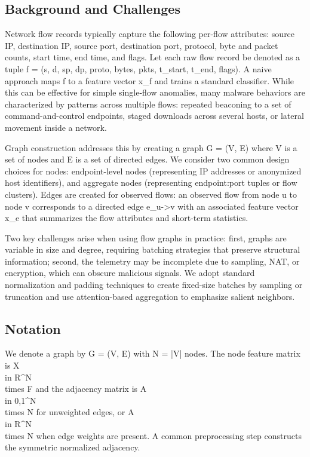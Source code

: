 \documentclass[conference]{IEEEtran}
\begin{document}
\subsection{Background and Challenges}

Network flow records typically capture the following per-flow attributes: source IP, destination IP, source port, destination port, protocol, byte and packet counts, start time, end time, and flags. Let each raw flow record be denoted as a tuple f = (s, d, sp, dp, proto, bytes, pkts, t_start, t_end, flags). A naive approach maps f to a feature vector x_f and trains a standard classifier. While this can be effective for simple single-flow anomalies, many malware behaviors are characterized by patterns across multiple flows: repeated beaconing to a set of command-and-control endpoints, staged downloads across several hosts, or lateral movement inside a network.

Graph construction addresses this by creating a graph G = (V, E) where V is a set of nodes and E is a set of directed edges. We consider two common design choices for nodes: endpoint-level nodes (representing IP addresses or anonymized host identifiers), and aggregate nodes (representing endpoint:port tuples or flow clusters). Edges are created for observed flows: an observed flow from node u to node v corresponds to a directed edge e_{u->v} with an associated feature vector x_e that summarizes the flow attributes and short-term statistics.

Two key challenges arise when using flow graphs in practice: first, graphs are variable in size and degree, requiring batching strategies that preserve structural information; second, the telemetry may be incomplete due to sampling, NAT, or encryption, which can obscure malicious signals. We adopt standard normalization and padding techniques to create fixed-size batches by sampling or truncation and use attention-based aggregation to emphasize salient neighbors.

\subsection{Notation}

We denote a graph by G = (V, E) with N = |V| nodes. The node feature matrix is X \\in R^{N \\times F} and the adjacency matrix is A \\in {0,1}^{N \\times N} for unweighted edges, or A \\in R^{N \\times N} when edge weights are present. A common preprocessing step constructs the symmetric normalized adjacency.
\end{document}

